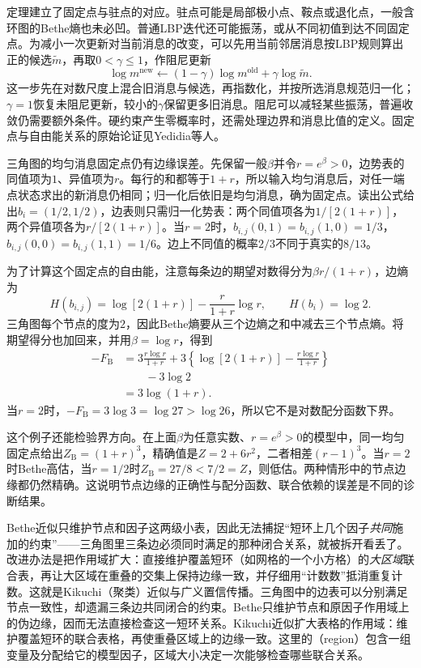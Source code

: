 定理建立了固定点与驻点的对应。驻点可能是局部极小点、鞍点或退化点，一般含环图的Bethe熵也未必凹。普通LBP迭代还可能振荡，或从不同初值到达不同固定点。为减小一次更新对当前消息的改变，可以先用当前邻居消息按LBP规则算出正的候选$\widetilde m$，再取$0<\gamma\leq1$，作阻尼更新
\[
  \log m^{\mathrm{new}}\leftarrow
      (1-\gamma)\log m^{\mathrm{old}}+\gamma\log\widetilde m.
\]
这一步先在对数尺度上混合旧消息与候选，再指数化，并按所选消息规范归一化；$\gamma=1$恢复未阻尼更新，较小的$\gamma$保留更多旧消息。阻尼可以减轻某些振荡，普遍收敛仍需要额外条件。硬约束产生零概率时，还需处理边界和消息比值的定义。固定点与自由能关系的原始论证见Yedidia等人。

三角图的均匀消息固定点仍有边缘误差。先保留一般$\beta$并令$r=e^\beta>0$，边势表的同值项为$1$、异值项为$r$。每行的和都等于$1+r$，所以输入均匀消息后，对任一端点状态求出的新消息仍相同；归一化后依旧是均匀消息，确为固定点。读出公式给出$b_i=(1/2,1/2)$，边表则只需归一化势表：两个同值项各为$1/[2(1+r)]$，两个异值项各为$r/[2(1+r)]$。当$r=2$时，$b_{i,j}(0,1)=b_{i,j}(1,0)=1/3$，$b_{i,j}(0,0)=b_{i,j}(1,1)=1/6$。边上不同值的概率$2/3$不同于真实的$8/13$。

为了计算这个固定点的自由能，注意每条边的期望对数得分为$\beta r/(1+r)$，边熵为
\[
  H(b_{i,j})=\log[2(1+r)]-\frac{r}{1+r}\log r,
  \qquad H(b_i)=\log2.
\]
三角图每个节点的度为$2$，因此Bethe熵要从三个边熵之和中减去三个节点熵。将期望得分也加回来，并用$\beta=\log r$，得到
\[
  \begin{aligned}
    -F_{\mathrm B}
      &=3\frac{r\log r}{1+r}
        +3\left\{\log[2(1+r)]
                     -\frac{r\log r}{1+r}\right\}\\
      &\qquad-3\log2\\
      &=3\log(1+r).
  \end{aligned}
\]
当$r=2$时，$-F_{\mathrm B}=3\log3=\log27>\log26$，所以它不是对数配分函数下界。

这个例子还能检验界方向。在上面$\beta$为任意实数、$r=e^\beta>0$的模型中，同一均匀固定点给出$Z_{\mathrm B}=(1+r)^3$，精确值是$Z=2+6r^2$，二者相差$(r-1)^3$。当$r=2$时Bethe高估，当$r=1/2$时$Z_{\mathrm B}=27/8<7/2=Z$，则低估。两种情形中的节点边缘都仍然精确。这说明节点边缘的正确性与配分函数、联合依赖的误差是不同的诊断结果。

\label{sec:pgm-variational-kikuchi}

Bethe近似只维护节点和因子这两级小表，因此无法捕捉“短环上几个因子\emph{共同}施加的约束”——三角图里三条边必须同时满足的那种闭合关系，就被拆开看丢了。改进办法是把作用域扩大：直接维护覆盖短环（如网格的一个小方格）的\emph{大区域}联合表，再让大区域在重叠的交集上保持边缘一致，并仔细用“计数数”抵消重复计数。这就是Kikuchi（聚类）近似与广义置信传播。三角图中的边表可以分别满足节点一致性，却遗漏三条边共同闭合的约束。Bethe只维护节点和原因子作用域上的伪边缘，因而无法直接检查这一短环关系。Kikuchi近似扩大表格的作用域：维护覆盖短环的联合表格，再使重叠区域上的边缘一致。这里的（region）包含一组变量及分配给它的模型因子，区域大小决定一次能够检查哪些联合关系。

